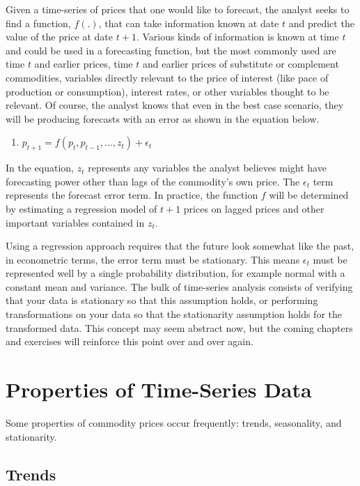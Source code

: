 \documentclass[
  letterpaper,
  DIV=11,
  numbers=noendperiod]{scrreprt}
\providecommand{\tightlist}{%
  \setlength{\itemsep}{0pt}\setlength{\parskip}{0pt}}\usepackage{longtable,booktabs,array}
\begin{document}
Given a time-series of prices that one would like to forecast, the
analyst seeks to find a function, \(f(.)\), that can take information
known at date \(t\) and predict the value of the price at date \(t+1\).
Various kinds of information is known at time \(t\) and could be used in
a forecasting function, but the most commonly used are time \(t\) and
earlier prices, time \(t\) and earlier prices of substitute or
complement commodities, variables directly relevant to the price of
interest (like pace of production or consumption), interest rates, or
other variables thought to be relevant. Of course, the analyst knows
that even in the best case scenario, they will be producing forecasts
with an error as shown in the equation below.

\begin{enumerate}
\def\labelenumi{(\arabic{enumi})}
\tightlist
\item
  \(p_{t+1} = f(p_t, p_{t-1}, ..., z_t) + \epsilon_t\)
\end{enumerate}

In the equation, \(z_t\) represents any variables the analyst believes
might have forecasting power other than lags of the commodity's own
price. The \(\epsilon_t\) term represents the forecast error term. In
practice, the function \(f\) will be determined by estimating a
regression model of \(t+1\) prices on lagged prices and other important
variables contained in \(z_t\).

Using a regression approach requires that the future look somewhat like
the past, in econometric terms, the error term must be stationary. This
means \(\epsilon_t\) must be represented well by a single probability
distribution, for example normal with a constant mean and variance. The
bulk of time-series analysis consists of verifying that your data is
stationary so that this assumption holds, or performing transformations
on your data so that the stationarity assumption holds for the
transformed data. This concept may seem abstract now, but the coming
chapters and exercises will reinforce this point over and over again.

\section{Properties of Time-Series
Data}\label{properties-of-time-series-data}

Some properties of commodity prices occur frequently: trends,
seasonality, and stationarity.

\subsection{Trends}\label{trends}
\end{document}
